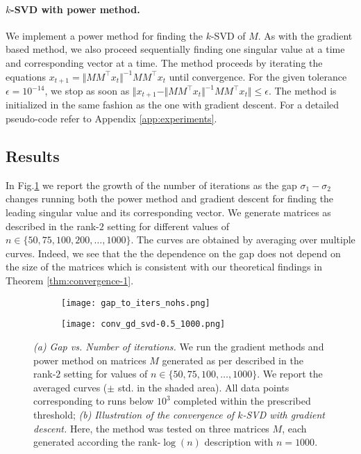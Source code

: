 \paragraph{$k$-SVD with power method.} We implement a power method for finding the $k$-SVD of $M$. As with the gradient based method, we also proceed sequentially finding one singular value at a time and corresponding vector at a time. The method proceeds by iterating  the equations $x_{t+1} =  \Vert MM^\top x_t \Vert^{-1} MM^\top x_t $ until convergence. For the given tolerance $\epsilon = 10^{-14}$, we stop as soon as $\Vert x_{t+1} -   \Vert MM^\top x_t \Vert^{-1} MM^\top x_t \Vert\le \epsilon $. The method is initialized in the same fashion as the one with gradient descent. For a detailed pseudo-code refer to Appendix \ref{app:experiments}.




\subsection{Results}


In Fig.\ref{fig:gap-to-iterations} we report the growth of the number of iterations as the gap $\sigma_1 - \sigma_2$ changes running both the power method and gradient descent for finding the leading singular value and its corresponding vector. We generate matrices as described in the rank-$2$ setting for different values of $n \in \lbrace 50, 75, 100, 200, \dots, 1000\rbrace$. The curves are  obtained by averaging over multiple curves. Indeed, we see that the the dependence on the gap does not depend on the size of the matrices which is consistent with our theoretical findings in Theorem  \ref{thm:convergence-1}.
\begin{figure}[ht!]
    \centering
    \begin{subfigure}[b]{.48\textwidth}
    \texttt{[image: gap\_to\_iters\_nohs.png]}
    \caption{}
    \label{fig:gap-to-iterations}
    \end{subfigure}
   \begin{subfigure}[b]{.48\textwidth}
    \texttt{[image: conv\_gd\_svd-0.5\_1000.png]}
    \caption{}
    \label{fig:convergence}
   \end{subfigure}
   \caption{}
   \caption{\emph{(a) Gap vs. Number of iterations.} We run the gradient methods and power method on matrices $M$ generated as per described in the rank-$2$ setting for values of $n \in \lbrace 50, 75, 100, \dots, 1000\rbrace$. We report the averaged curves ($\pm$ std. in the shaded area). All data points corresponding to runs below $10^3$ completed within the prescribed threshold; \emph{(b) Illustration of the convergence of $k$-SVD with gradient descent.} Here, the method was tested on three matrices $M$, each generated according the rank-$\log(n)$ description with $n = 1000$.}
\end{figure}

